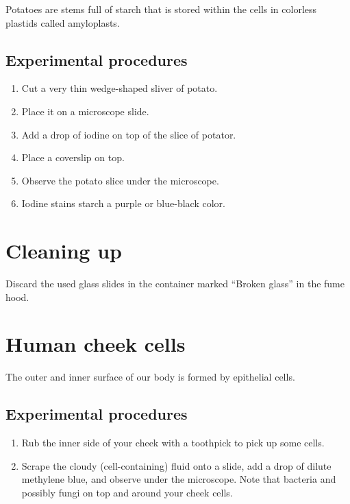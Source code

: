 Potatoes are stems full of starch that is stored within the cells in
colorless plastids called amyloplasts.

\subsection{Experimental procedures}\label{experimental-procedures-10}

\begin{enumerate}
\def\labelenumi{\arabic{enumi}.}
\tightlist
\item
  Cut a very thin wedge-shaped sliver of potato.
\item
  Place it on a microscope slide.
\item
  Add a drop of iodine on top of the slice of potator.
\item
  Place a coverslip on top.
\item
  Observe the potato slice under the microscope.
\item
  Iodine stains starch a purple or blue-black color.
\end{enumerate}

\section{Cleaning up}\label{cleaning-up-3}

Discard the used glass slides in the container marked ``Broken glass''
in the fume hood.

\section{Human cheek cells}\label{human-cheek-cells}

The outer and inner surface of our body is formed by epithelial cells.

\subsection{Experimental procedures}\label{experimental-procedures-11}

\begin{enumerate}
\def\labelenumi{\arabic{enumi}.}
\tightlist
\item
  Rub the inner side of your cheek with a toothpick to pick up some
  cells.
\item
  Scrape the cloudy (cell-containing) fluid onto a slide, add a drop of
  dilute methylene blue, and observe under the microscope. Note that
  bacteria and possibly fungi on top and around your cheek cells.
\end{enumerate}

